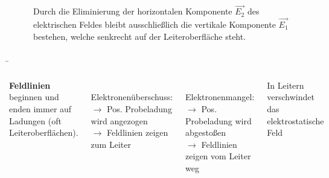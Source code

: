 \begin{frame}
{	 \begin{figure}[h!]
		\centering
		
		\caption{Durch die Eliminierung der horizontalen Komponente $\vec{E_2}$ des elektrischen Feldes bleibt ausschließlich die vertikale Komponente $\vec{E_1}$ bestehen, welche senkrecht auf der Leiteroberfläche steht. }
		\label{fig:e_vertikal}
	\end{figure}

	
	}
	
	
	\b{

	\begin{columns}

	   \textbf{Feldlinien} beginnen und enden immer auf Ladungen (oft Leiteroberflächen).
		
		
		\phantom{.}\\

		
			Elektronenüberschuss:\\
			$\rightarrow$ Pos. Probeladung wird angezogen\\
			$\rightarrow$ Feldlinien zeigen zum Leiter
			
			\phantom{.}\\


			Elektronenmangel:\\
			$\rightarrow$ Pos. Probeladung wird abgestoßen\\
			$\rightarrow$ Feldlinien zeigen vom Leiter weg
			

			\begin{Merksatz}{}
				In Leitern verschwindet das\\
				 elektrostatische Feld
			\end{Merksatz}
	
		\begin{figure}[h!]
			\centering
			
		\end{figure}   

		\begin{figure}[h!]
			\centering
			
		\end{figure}   


\end{columns}}
\end{frame}
